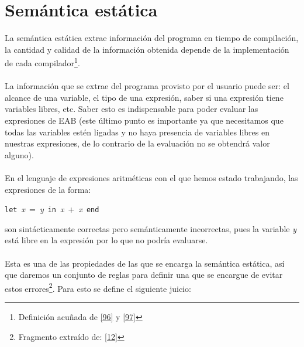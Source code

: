    \section{Semántica estática}
    La semántica estática extrae información del programa en tiempo de compilación, la cantidad y calidad de la información obtenida depende de la implementación de cada compilador\footnote{Definición acuñada de \hyperlink{96}{[96]} y \hyperlink{97}{[97]}}. \\\\
    La información que se extrae del programa provisto por el usuario puede ser: el alcance de una variable, el tipo de una expresión, saber si una expresión tiene variables libres, etc. Saber esto es indispensable  para poder evaluar las expresiones de \textsf{EAB} (este último punto es importante ya que necesitamos que todas las variables estén ligadas y no haya presencia de variables libres en nuestras expresiones, de lo contrario de la evaluación no se obtendrá valor alguno).\\\\
    En el lenguaje de expresiones aritméticas con el que hemos estado trabajando, las expresiones de la forma:
        \begin{center}
                \texttt{let}\ \textit{x}\ =\ \textit{y}\ \texttt{in}\ \textit{x}\ +\ \textit{x}\ \texttt{end}
        \end{center}
    son sintácticamente correctas pero semánticamente incorrectas, pues la variable \textit{y} está libre en la expresión por lo que no podría evaluarse.\\\\
    Esta es una de las propiedades de las que se encarga la semántica estática, así que daremos un conjunto de reglas para definir una que se encargue de evitar estos errores\footnote{Fragmento extraído de: \hyperlink{12}{[12]} }. Para esto se define el siguiente juicio: 

